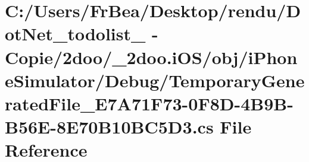 \hypertarget{i_o_s_2obj_2i_phone_simulator_2_debug_2_temporary_generated_file___e7_a71_f73-0_f8_d-4_b9_b-_b56_e-8_e70_b10_b_c5_d3_8cs}{
\section{C:/Users/FrBea/Desktop/rendu/DotNet\_\-todolist\_ - Copie/2doo/\_\-2doo.iOS/obj/iPhoneSimulator/Debug/TemporaryGeneratedFile\_\-E7A71F73-0F8D-4B9B-B56E-8E70B10BC5D3.cs File Reference}
\label{i_o_s_2obj_2i_phone_simulator_2_debug_2_temporary_generated_file___e7_a71_f73-0_f8_d-4_b9_b-_b56_e-8_e70_b10_b_c5_d3_8cs}
}
